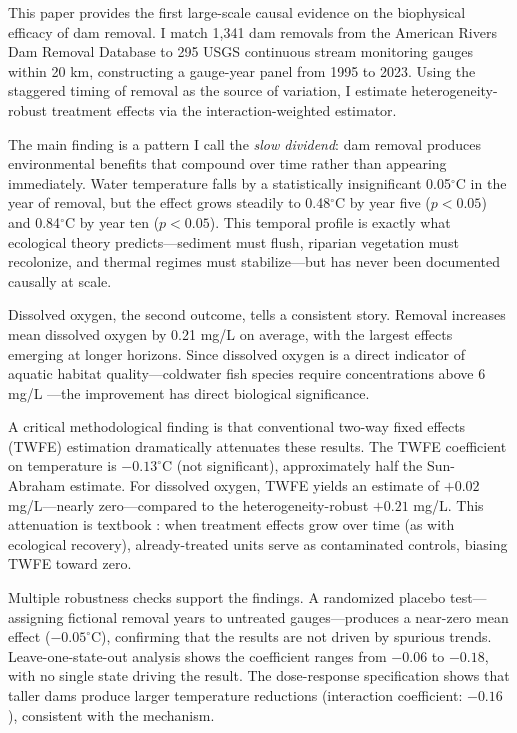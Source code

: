 \documentclass[12pt]{article}
\begin{document}
This paper provides the first large-scale causal evidence on the biophysical efficacy of dam removal. I match 1,341 dam removals from the American Rivers Dam Removal Database to 295 USGS continuous stream monitoring gauges within 20 km, constructing a gauge-year panel from 1995 to 2023. Using the staggered timing of removal as the source of variation, I estimate heterogeneity-robust treatment effects via the \citet{sunab2021} interaction-weighted estimator.

The main finding is a pattern I call the \textit{slow dividend}: dam removal produces environmental benefits that compound over time rather than appearing immediately. Water temperature falls by a statistically insignificant 0.05$^{\circ}$C in the year of removal, but the effect grows steadily to 0.48$^{\circ}$C by year five ($p < 0.05$) and 0.84$^{\circ}$C by year ten ($p < 0.05$). This temporal profile is exactly what ecological theory predicts---sediment must flush, riparian vegetation must recolonize, and thermal regimes must stabilize---but has never been documented causally at scale.

Dissolved oxygen, the second outcome, tells a consistent story. Removal increases mean dissolved oxygen by 0.21 mg/L on average, with the largest effects emerging at longer horizons. Since dissolved oxygen is a direct indicator of aquatic habitat quality---coldwater fish species require concentrations above 6 mg/L \citep{epa2003}---the improvement has direct biological significance.

A critical methodological finding is that conventional two-way fixed effects (TWFE) estimation dramatically attenuates these results. The TWFE coefficient on temperature is $-0.13^{\circ}$C (not significant), approximately half the Sun-Abraham estimate. For dissolved oxygen, TWFE yields an estimate of $+0.02$ mg/L---nearly zero---compared to the heterogeneity-robust $+0.21$ mg/L. This attenuation is textbook \citet{goodmanbacon2021}: when treatment effects grow over time (as with ecological recovery), already-treated units serve as contaminated controls, biasing TWFE toward zero.

Multiple robustness checks support the findings. A randomized placebo test---assigning fictional removal years to untreated gauges---produces a near-zero mean effect ($-0.05^{\circ}$C), confirming that the results are not driven by spurious trends. Leave-one-state-out analysis shows the coefficient ranges from $-0.06$ to $-0.18$, with no single state driving the result. The dose-response specification shows that taller dams produce larger temperature reductions (interaction coefficient: $-0.16$), consistent with the mechanism.
\end{document}
